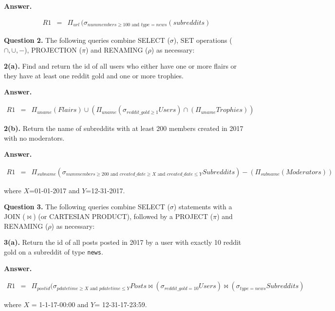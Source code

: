 \documentclass[11pt]{article}
\begin{document}
{\bf Answer.} 

\begin{eqnarray*}
  R1 & = & \Pi_{url} \, (\sigma_{nummembers\geq 100 \mbox{ and } type=news} (subreddits) 
  \end{eqnarray*}


\newpage

{\bf Question 2.} The following queries combine SELECT ($\sigma$), SET
operations ($\cap,\cup,-$), PROJECTION ($\pi$) and RENAMING
($\rho$) as necessary:

{\bf 2(a).} Find and return the id of all users who either have one or more
  flairs or they have at least one reddit gold and one or more
  trophies.

{\bf Answer.} 

\begin{eqnarray*}
  R1 & = & \Pi_{uname} (Flairs) \cup (\Pi_{uname} (\sigma_{reddit\_gold\geq 1} Users) \cap (\Pi_{uname} Trophies)) 
\end{eqnarray*}


{\bf 2(b).} Return the name of subreddits with at least 200 members created
  in 2017 with no moderators.
  
{\bf Answer.} 

\begin{eqnarray*}
  R1 & = & \Pi_{subname} (\sigma_{nummembers\geq 200 \mbox{ and } created\_date\geq X \mbox{ and } created\_date\leq Y} Subreddits) - (\Pi_{subname} (Moderators))
\end{eqnarray*}

where $X$=01-01-2017 and $Y$=12-31-2017.

\newpage 

{\bf Question 3.} The following queries combine SELECT ($\sigma$)
statements with a JOIN ($\bowtie$) (or CARTESIAN PRODUCT), followed
by a PROJECT ($\pi$) and RENAMING ($\rho$) as necessary:

{\bf 3(a).} Return the id of all posts posted in 2017 by a user with
exactly 10 reddit gold on a subreddit of type {\tt news}.

{\bf Answer.} 

\begin{eqnarray*}
  R1 & = & \Pi_{postid} ( \sigma_{pdatetime \geq X \mbox { and } pdatetime \leq Y} Posts \bowtie (\sigma_{reddit\_gold=10} Users) \bowtie
  (\sigma_{type=news} Subreddits)
\end{eqnarray*}

where $X$ = 1-1-17-00:00 and $Y$= 12-31-17-23:59.
\end{document}
